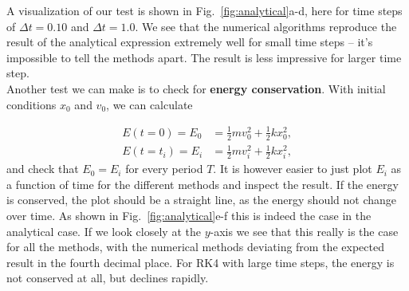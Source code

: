 \documentclass{article}
\begin{document}
\begin{multicols}{2}
A visualization of our test is shown in Fig.~\ref{fig:analytical}a-d, here for time steps of $\Delta t = 0.10$ and $\Delta t = 1.0$. We see that the numerical algorithms reproduce the result of the analytical expression extremely well for small time steps -- it's impossible to tell the methods apart. The result is less impressive for larger time step.\\

\noindent Another test we can make is to check for \textbf{energy conservation}. With initial conditions $x_0$ and $v_0$, we can calculate

\begin{equation}
	\begin{aligned}
		E(t = 0) = E_0 &= \frac{1}{2}mv_0^2 + \frac{1}{2}kx_0^2, \\
		E(t = t_i) = E_i &= \frac{1}{2}mv_i^2 + \frac{1}{2}kx_i^2,
	\end{aligned}
\end{equation}
and check that $E_0 = E_i$ for every period $T$. It is however easier to just plot $E_i$ as a function of time for the different methods and inspect the result. If the energy is conserved, the plot should be a straight line, as the energy should not change over time. As shown in Fig.~\ref{fig:analytical}e-f this is indeed the case in the analytical case. If we look closely at the $y$-axis we see that this really is the case for all the methods, with the numerical methods deviating from the expected result in the fourth decimal place. For RK4 with large time steps, the energy is not conserved at all, but declines rapidly.\\



\end{multicols}
\end{document}
